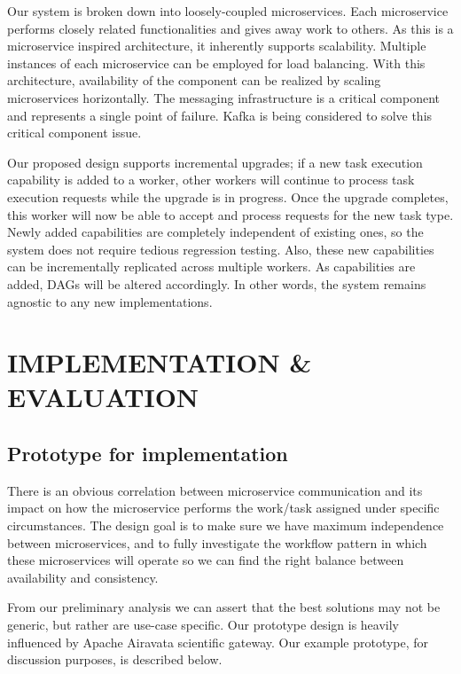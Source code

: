 \documentclass[sigconf]{acmart}
\begin{document}
Our system is broken down into loosely-coupled microservices. Each microservice performs closely related functionalities and gives away work to others. As this is a microservice inspired architecture, it inherently supports scalability. Multiple instances of each microservice can be employed for load balancing. With this architecture, availability of the component can be realized by scaling microservices horizontally. The messaging infrastructure is a critical component and represents a single point of failure. Kafka \cite{kafka2014high} is being considered to solve this critical component issue. \newline

Our proposed design supports incremental upgrades; if a new task execution capability is added to a worker, other workers will continue to process task execution requests while the upgrade is in progress. Once the upgrade completes, this worker will now be able to accept and process requests for the new task type. Newly added capabilities are completely independent of existing ones, so the system does not require tedious regression testing. Also, these new capabilities can be incrementally replicated across multiple workers. As capabilities are added, DAG\textquotesingle s will be altered accordingly.  In other words, the system remains agnostic to any new implementations.

\section{IMPLEMENTATION \& EVALUATION}

\subsection{Prototype for implementation}
There is an obvious  correlation between microservice communication and its impact on how the microservice performs the work/task assigned under specific circumstances. The design goal is to make sure we have maximum independence between microservices, and to fully investigate the workflow pattern in which these microservices will operate so we can find the right balance between availability and consistency. \newline

From our preliminary analysis we can assert that the best solutions may not be generic, but rather are use-case specific. Our prototype design is heavily influenced by Apache Airavata scientific gateway. Our example prototype, for discussion purposes, is described below.
\end{document}

